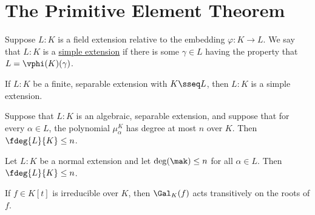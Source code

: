 \documentclass[a4paper]{article}
\begin{document}
\section{The Primitive Element Theorem}
\begin{tdefinition}
  Suppose \( L:K \) is a field extension relative to the embedding \( \varphi:K\to L \).
  We say that \( L:K \) is a \ul{simple extension} if there is some \( \gamma\in L \) having the property that \( L=\vphi(K)(\gamma) \).
\end{tdefinition}

\begin{ttheorem}
  If \( L:K \) be a finite, separable extension with \( K\sseq L \), then \( L:K \) is a simple extension.
\end{ttheorem}

\begin{tcorollary}
  Suppose that \( L:K \) is an algebraic, separable extension, and suppose that for every \( \alpha\in L \), the polynomial \( \mu_\alpha^K \) has degree at most \( n \) over \( K \).
  Then \( \fdeg{L}{K}\leq n \).
\end{tcorollary}

\quad Let \( L:K \) be a normal extension and let \( \deg(\mak)\leq n \) for all \( \alpha\in L \).
Then \( \fdeg{L}{K}\leq n \).

\begin{tcorollary}
  If \( f\in K[t] \) is irreducible over \( K \), then \( \Gal_K(f) \) acts transitively on the roots of \( f \).
\end{tcorollary}
\end{document}
